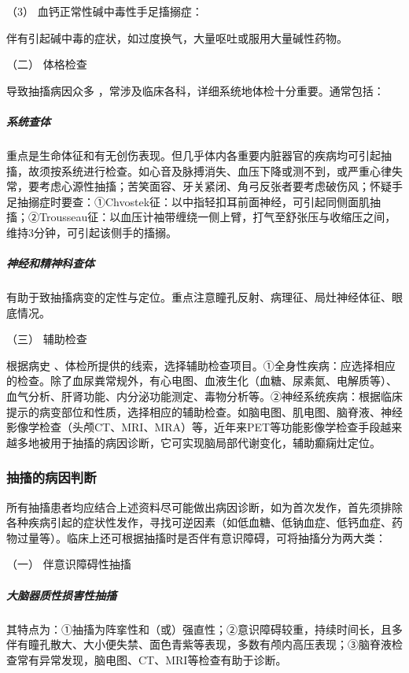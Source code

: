 \hypertarget{text00016.htmlux5cux23CHP1-5-2-1-1-3-3}{}
（3） 血钙正常性碱中毒性手足搐搦症：

伴有引起碱中毒的症状，如过度换气，大量呕吐或服用大量碱性药物。

\hypertarget{text00016.htmlux5cux23CHP1-5-2-1-2}{}
（二） 体格检查

导致抽搐病因众多 ，常涉及临床各科，详细系统地体检十分重要。通常包括：

\subparagraph{系统查体}

重点是生命体征和有无创伤表现。但几乎体内各重要内脏器官的疾病均可引起抽搐，故须按系统进行检查。如心音及脉搏消失、血压下降或测不到，或严重心律失常，要考虑心源性抽搐；苦笑面容、牙关紧闭、角弓反张者要考虑破伤风；怀疑手足抽搦症时要查：①Chvostek征：以中指轻扣耳前面神经，可引起同侧面肌抽搐；②Trousseau征：以血压计袖带缠绕一侧上臂，打气至舒张压与收缩压之间，维持3分钟，可引起该侧手的搐搦。

\subparagraph{神经和精神科查体}

有助于致抽搐病变的定性与定位。重点注意瞳孔反射、病理征、局灶神经体征、眼底情况。

\hypertarget{text00016.htmlux5cux23CHP1-5-2-1-3}{}
（三） 辅助检查

根据病史
、体检所提供的线索，选择辅助检查项目。①全身性疾病：应选择相应的检查。除了血尿粪常规外，有心电图、血液生化（血糖、尿素氮、电解质等）、血气分析、肝肾功能、内分泌功能测定、毒物分析等。②神经系统疾病：根据临床提示的病变部位和性质，选择相应的辅助检查。如脑电图、肌电图、脑脊液、神经影像学检查（头颅CT、MRI、MRA）等，近年来PET等功能影像学检查手段越来越多地被用于抽搐的病因诊断，它可实现脑局部代谢变化，辅助癫痫灶定位。

\subsubsection{抽搐的病因判断}

所有抽搐患者均应结合上述资料尽可能做出病因诊断，如为首次发作，首先须排除各种疾病引起的症状性发作，寻找可逆因素（如低血糖、低钠血症、低钙血症、药物过量等）。临床上还可根据抽搐时是否伴有意识障碍，可将抽搐分为两大类：

\hypertarget{text00016.htmlux5cux23CHP1-5-2-2-1}{}
（一） 伴意识障碍性抽搐

\subparagraph{大脑器质性损害性抽搐}

其特点为：①抽搐为阵挛性和（或）强直性；②意识障碍较重，持续时间长，且多伴有瞳孔散大、大小便失禁、面色青紫等表现，多数有颅内高压表现；③脑脊液检查常有异常发现，脑电图、CT、MRI等检查有助于诊断。

